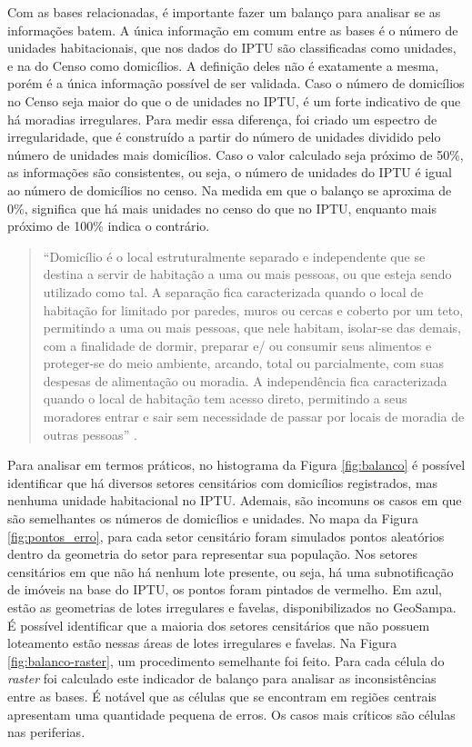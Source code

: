Com as bases relacionadas, é importante fazer um balanço para analisar se as informações batem. A única informação em comum entre as bases é o número de unidades habitacionais, que nos dados do IPTU são classificadas como unidades, e na do Censo como domicílios. A definição deles não é exatamente a mesma, porém é a única informação possível de ser validada. Caso o número de domicílios no Censo seja maior do que o de unidades no IPTU, é um forte indicativo de que há moradias irregulares. Para medir essa diferença, foi criado um espectro de irregularidade, que é construído a partir do número de unidades dividido pelo número de unidades mais domicílios. Caso o valor calculado seja próximo de 50\%, as informações são consistentes, ou seja, o número de unidades do IPTU é igual ao número de domicílios no censo. Na medida em que o balanço se aproxima de 0\%, significa que há mais unidades no censo do que no IPTU, enquanto mais próximo de 100\% indica o contrário.

\begin{quote}
    ``Domicílio é o local estruturalmente separado e independente que se destina a servir de habitação a uma ou mais pessoas, ou que esteja sendo utilizado como tal. A separação fica caracterizada quando o local de habitação for limitado por paredes, muros ou cercas e coberto por um teto, permitindo a uma ou mais pessoas, que nele habitam, isolar-se das demais, com a finalidade de dormir, preparar e/ ou consumir seus alimentos e proteger-se do meio ambiente, arcando, total ou parcialmente, com suas despesas de alimentação ou moradia. A independência fica caracterizada quando o local de habitação tem acesso direto, permitindo a seus moradores entrar e sair sem necessidade de passar por locais de moradia de outras pessoas'' \cite{IBGE2013}.
\end{quote}

Para analisar em termos práticos, no histograma da Figura \ref{fig:balanco} é possível identificar que há diversos setores censitários com domicílios registrados, mas nenhuma unidade habitacional no IPTU. Ademais, são incomuns os casos em que são semelhantes os números de domicílios e unidades. No mapa da Figura \ref{fig:pontos_erro}, para cada setor censitário foram simulados pontos aleatórios dentro da geometria do setor para representar sua população. Nos setores censitários em que não há nenhum lote presente, ou seja, há uma subnotificação de imóveis na base do IPTU, os pontos foram pintados de vermelho. Em azul, estão as geometrias de lotes irregulares e favelas, disponibilizados no GeoSampa. É possível identificar que a maioria dos setores censitários que não possuem loteamento estão nessas áreas de lotes irregulares e favelas.  Na Figura \ref{fig:balanco-raster}, um procedimento semelhante foi feito. Para cada célula do \textit{raster} foi calculado este indicador de balanço para analisar as inconsistências entre as bases. É notável que as células que se encontram em regiões centrais apresentam uma quantidade pequena de erros. Os casos mais críticos são células nas periferias.

